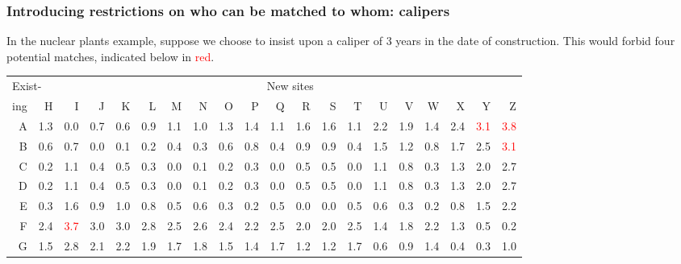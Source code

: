 \begin{frame}
\frametitle{Introducing restrictions on who can be matched to whom:
  calipers}
In the nuclear plants example, suppose we choose to insist upon a
  \alert{caliper} of 3 years in the date of construction.  This would
  forbid four potential matches, indicated below in \textcolor{red}{red}.



\addtolength{\tabcolsep}{-\tabcolsepadj} \vfill
\begin{center}
{\footnotesize
\begin{tabular}{|r|rrrrrrrrrrrrrrrrrrr|}
\hline
\multicolumn{2}{|l}{Exist-} & \multicolumn{18}{c|}{New sites} \\
\multicolumn{1}{|l|}{ing}& H & I & J & K & L & M & N & O & P & Q & R & S & T & U & V & W & X & Y & Z \\ \hline
A & 1.3 & 0.0 & 0.7 & 0.6 & 0.9 & 1.1 & 1.0 & 1.3 & 1.4 & 1.1 & 1.6 & 1.6 & 1.1 & 2.2 & 1.9 & 1.4 & 2.4 & \textcolor{red}{3.1} & \textcolor{red}{3.8} \\
  B & 0.6 & 0.7 & 0.0 & 0.1 & 0.2 & 0.4 & 0.3 & 0.6 & 0.8 & 0.4 & 0.9 & 0.9 & 0.4 & 1.5 & 1.2 & 0.8 & 1.7 & 2.5 & \textcolor{red}{3.1} \\
  C & 0.2 & 1.1 & 0.4 & 0.5 & 0.3 & 0.0 & 0.1 & 0.2 & 0.3 & 0.0 & 0.5 & 0.5 & 0.0 & 1.1 & 0.8 & 0.3 & 1.3 & 2.0 & 2.7 \\
  D & 0.2 & 1.1 & 0.4 & 0.5 & 0.3 & 0.0 & 0.1 & 0.2 & 0.3 & 0.0 & 0.5 & 0.5 & 0.0 & 1.1 & 0.8 & 0.3 & 1.3 & 2.0 & 2.7 \\
  E & 0.3 & 1.6 & 0.9 & 1.0 & 0.8 & 0.5 & 0.6 & 0.3 & 0.2 & 0.5 & 0.0 & 0.0 & 0.5 & 0.6 & 0.3 & 0.2 & 0.8 & 1.5 & 2.2 \\
  F & 2.4 & \textcolor{red}{3.7} & 3.0 & 3.0 & 2.8 & 2.5 & 2.6 & 2.4 & 2.2 & 2.5 & 2.0 & 2.0 & 2.5 & 1.4 & 1.8 & 2.2 & 1.3 & 0.5 & 0.2 \\
  G & 1.5 & 2.8 & 2.1 & 2.2 & 1.9 & 1.7 & 1.8 & 1.5 & 1.4 & 1.7 & 1.2 & 1.2 & 1.7 & 0.6 & 0.9 & 1.4 & 0.4 & 0.3 & 1.0 \\
\hline
\end{tabular}
}
\vfill \addtolength{\tabcolsep}{\tabcolsepadj}
\end{center}
\end{frame}




